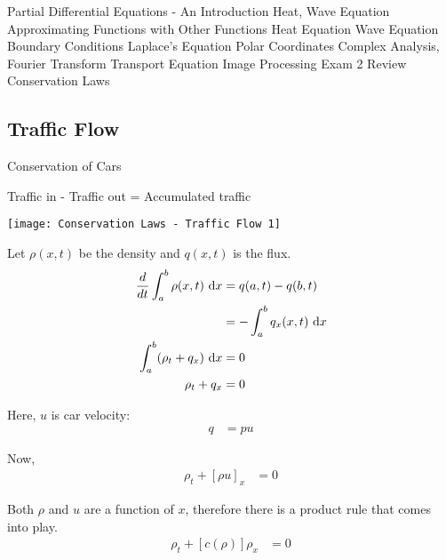 \documentclass{article}
\begin{document}
\maketitle
%
\newpage
%
\tableofcontents
\newpage
{Partial Differential Equations - An Introduction}
{Heat, Wave Equation}
{Approximating Functions with Other Functions}
{Heat Equation}
{Wave Equation}
{Boundary Conditions}
{Laplace's Equation}
{Polar Coordinates}
{Complex Analysis, Fourier Transform}
{Transport Equation}
{Image Processing}
{Exam 2 Review}
{Conservation Laws}
\newpage
\subsection{Traffic Flow}
Conservation of Cars

Traffic in - Traffic out = Accumulated traffic

\begin{center}
  \texttt{[image: Conservation Laws - Traffic Flow 1]}
\end{center}

Let $\rho(x, t)$ be the density and $q(x, t)$ is the flux.
%
\begin{align}
  \frac{d}{dt} \int^b_a \rho(x, t)\ \text dx
  & = q(a, t) - q(b, t)\\
  & = -\int^b_a q_x (x, t)\ \text dx\\
  \int^b_a (\rho_t + q_x)\ \text dx & = 0\\
  \rho_t + q_x & = 0
\end{align}

Here, $u$ is car velocity:
%
\begin{align}
  q & = pu
\end{align}

Now,
%
\begin{align}
  \rho_t + [\rho u]_x & = 0
\end{align}

Both $\rho$ and $u$ are a function of $x$, therefore there is a product rule that comes into play.
%
\begin{align}
  \rho_t + [c(\rho)]\rho_x & = 0
\end{align}
\end{document}
